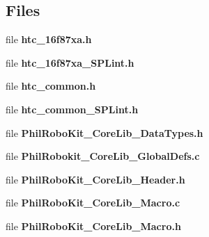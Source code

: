 \subsection*{Files}
\begin{DoxyCompactItemize}
\item 
file {\bf htc\-\_\-16f87xa.\-h}
\item 
file {\bf htc\-\_\-16f87xa\-\_\-\-S\-P\-Lint.\-h}
\item 
file {\bf htc\-\_\-common.\-h}
\item 
file {\bf htc\-\_\-common\-\_\-\-S\-P\-Lint.\-h}
\item 
file {\bf Phil\-Robo\-Kit\-\_\-\-Core\-Lib\-\_\-\-Data\-Types.\-h}
\item 
file {\bf Phil\-Robokit\-\_\-\-Core\-Lib\-\_\-\-Global\-Defs.\-c}
\item 
file {\bf Phil\-Robo\-Kit\-\_\-\-Core\-Lib\-\_\-\-Header.\-h}
\item 
file {\bf Phil\-Robo\-Kit\-\_\-\-Core\-Lib\-\_\-\-Macro.\-c}
\item 
file {\bf Phil\-Robo\-Kit\-\_\-\-Core\-Lib\-\_\-\-Macro.\-h}
\end{DoxyCompactItemize}
